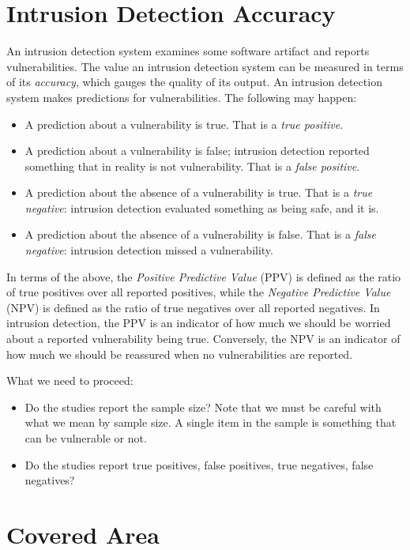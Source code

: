 \documentclass[conference]{IEEEtran}
\begin{document}
\section{Intrusion Detection Accuracy}

An intrusion detection system examines some software artifact and
reports vulnerabilities. The value an intrusion detection system can
be measured in terms of its \emph{accuracy}, which gauges the quality
of its output. An intrusion detection system makes predictions for
vulnerabilities. The following may happen:
\begin{itemize}
\item A prediction about a vulnerability is true. That is a \emph{true
    positive}. 
\item A prediction about a vulnerability is false; intrusion
  detection reported something that in reality is not vulnerability.
  That is a \emph{false positive}.
\item A prediction about the absence of a vulnerability is true. That
  is a \emph{true negative}: intrusion detection evaluated something
  as being safe, and it is.
\item A prediction about the absence of a vulnerability is false. That
  is a \emph{false negative}: intrusion detection missed a
  vulnerability.
\end{itemize}
In terms of the above, the \emph{Positive Predictive Value} (PPV) is
defined as the ratio of true positives over all reported positives,
while the \emph{Negative Predictive Value} (NPV) is defined as the
ratio of true negatives over all reported negatives. In intrusion
detection, the PPV is an indicator of how much we should be worried
about a reported vulnerability being true. Conversely, the NPV is an
indicator of how much we should be reassured when no vulnerabilities
are reported.

What we need to proceed:
\begin{itemize}
\item Do the studies report the sample size? Note that we must be
  careful with what we mean by sample size. A single item in the
  sample is something that can be vulnerable or not. 
\item Do the studies report true positives, false positives, true
  negatives, false negatives?
\end{itemize}


\section{Covered Area}
\end{document}
